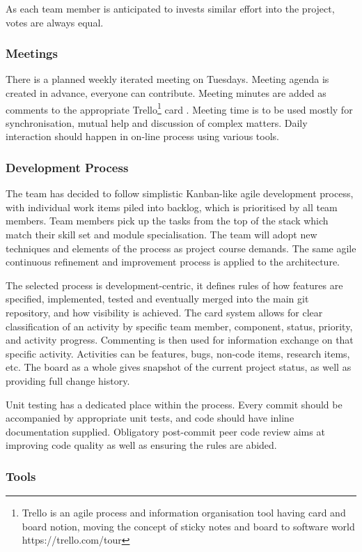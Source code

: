 As each team member is anticipated to invests similar effort into the project, votes are always equal.
\subsubsection {Meetings}
There is a planned weekly iterated meeting on Tuesdays. Meeting agenda is created in advance, everyone can
contribute. Meeting minutes are added as comments to the appropriate Trello\footnote{Trello is an agile process and information organisation tool having card and board notion, moving the concept of sticky notes and board to software world https://trello.com/tour} card
. Meeting time is to be used mostly for synchronisation, mutual help and discussion of
 complex matters. Daily interaction should happen in on-line process using various tools.

\subsubsection{Development Process}
The team has decided to follow simplistic Kanban-like\cite{Ahmed} agile development process, with individual work items piled into backlog,
which is prioritised by all team members. Team members pick up the tasks from the top of the stack which match their skill set
and module specialisation. The team will adopt new techniques and elements of the process as project course demands.
The same agile continuous refinement and improvement process is applied to the architecture.

The selected process is development-centric, it defines rules of how features are specified, implemented, tested and eventually
merged into the main git repository, and how visibility is achieved. The card system allows for clear classification of an activity by specific team member, component, status, priority, and activity progress. Commenting is then used for information exchange on that specific activity. Activities can be features, bugs, non-code items, research items, etc. The board as a whole gives snapshot of the current project status, as well as providing full change history.

Unit testing has a dedicated place within the process. Every commit should be accompanied by appropriate unit tests, and code should have
inline documentation supplied. Obligatory post-commit peer code review aims at improving code quality as well as ensuring the rules are abided.

\subsubsection{Tools}

